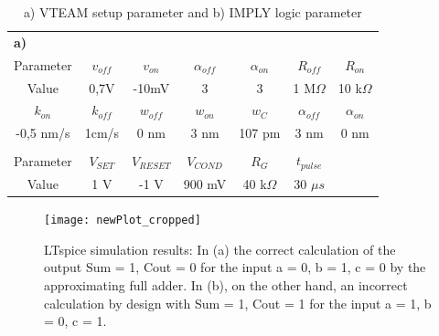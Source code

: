 \documentclass[]{IEEEtran}
\begin{document}
\begin{table}[h]
\centering
\caption{a) VTEAM setup parameter and b) IMPLY logic parameter}
\setlength{\tabcolsep}{1mm}
\begin{tabular}{|c|c|c|c|c|c|c}
    \multicolumn{7}{l}{\textbf{a)}} \\
    \addlinespace[1ex]  
  \hline 
Parameter & $v_{off}$  & $v_{on}$    & $\alpha_{off}$ & $\alpha_{on}$ & $R_{off}$   & \multicolumn{1}{c|}{$R_{on}$}     \\ \hline
Value     & 0,7V  & -10mV  & 3         & 3       & 1 M$\Omega$ & \multicolumn{1}{c|}{10 k$\Omega$} \\ \hline \addlinespace[1ex] \hline
$k_{on}$       & $k_{off}$  & $w_{off}$   & $w_{on}$       & $w_{C}$       & $\alpha_{off}$   & \multicolumn{1}{c|}{$\alpha_{on}$}     \\ \hline
-0,5 nm/s & 1cm/s & 0 nm   & 3 nm      & 107 pm   & 3 nm   & \multicolumn{1}{c|}{0 nm}    \\ \hline
  \addlinespace[1ex]  
    \multicolumn{7}{l}{\textbf{b)}} \\
    \addlinespace[1ex]  
  \cline{1-6}
Parameter & $V_{SET}$  & $V_{RESET}$ & $V_{COND}$     & $R_{G}$      & $t_{pulse}$ &                              \\ \cline{1-6}
Value     & 1 V   & -1 V   & 900 mV    & 40 k$\Omega$ & 30 $\mu s$  &                              \\ \cline{1-6}
\end{tabular}
\label{tab:setupsandparameter}
\end{table}

\begin{figure}[h]
	\centering
	\texttt{[image: newPlot\_cropped]}
	\caption{LTspice simulation results: In (a) the correct calculation of the output Sum = 1, Cout = 0 for the input a = 0, b = 1, c = 0 by the approximating full adder. In (b), on the other hand, an incorrect calculation by design with Sum = 1, Cout = 1 for the input a = 1, b = 0, c = 1.}
	\label{fig:input033300}
\end{figure}
\end{document}

